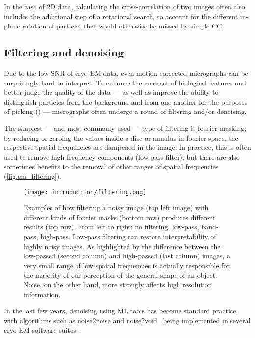 In the case of 2D data, calculating the cross-correlation of two images often also includes the additional step of a rotational search, to account for the different in-plane rotation of particles that would otherwise be missed by simple CC.

\subsection{Filtering and denoising}\label{em_filtering_and_denoising}

Due to the low SNR of cryo-EM data, even motion-corrected micrographs can be surprisingly hard to interpret.
To enhance the contrast of biological features and better judge the quality of the data --- as well as improve the ability to distinguish particles from the background and from one another for the purposes of picking () --- micrographs often undergo a round of filtering and/or denoising.

The simplest --- and most commonly used --- type of filtering is fourier masking; by reducing or zeroing the values inside a disc or annulus in fourier space, the respective spatial frequencies are dampened in the image.
In practice, this is often used to remove high-frequency components (low-pass filter), but there are also sometimes benefits to the removal of other ranges of spatial frequencies (\autoref{fig:em_filtering}).

\begin{figure}[ht]
    \centering
    \texttt{[image: introduction/filtering.png]}
    \caption[Fourier filtering]{Examples of how filtering a noisy image (top left image) with different kinds of fourier masks (bottom row) produces different results (top row). From left to right: no filtering, low-pass, band-pass, high-pass. Low-pass filtering can restore interpretability of highly noisy images. As highlighted by the difference between the low-passed (second column) and high-passed (last column) images, a very small range of low spatial frequencies is actually responsible for the majority of our perception of the general shape of an object. Noise, on the other hand, more strongly affects high resolution information.}
    \label{fig:em_filtering}
\end{figure}

In the last few years, denoising using ML tools has become standard practice, with algorithms such as noise2noise and noise2void~\cite{lehtinenNoise2NoiseLearningImage2018,krullNoise2VoidLearningDenoising2019} being implemented in several cryo-EM software suites~\cite{beplerTopazDenoiseGeneralDeep2020,tegunovRealtimeCryoelectronMicroscopy2019,buchholzCryoCAREContentAwareImage2018}.

